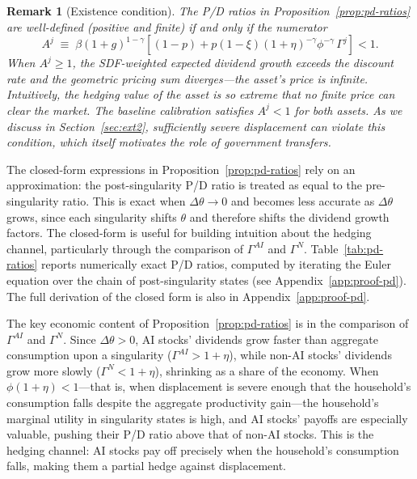\documentclass[12pt]{article}
\newtheorem{remark}{Remark}
\begin{document}
\begin{remark}[Existence condition] \label{rem:existence} %
The P/D ratios in Proposition~\ref{prop:pd-ratios} are well-defined (positive and finite) if and only if the numerator
\begin{equation}
A^j \;\equiv\; \beta(1+g)^{1-\gamma}\left[(1-p) + p(1-\xi)(1+\eta)^{-\gamma}\phi^{-\gamma}\,\Gamma^j\right] < 1. \label{eq:existence}
\end{equation}
When $A^j \geq 1$, the SDF-weighted expected dividend growth exceeds the discount rate and the geometric pricing sum diverges---the asset's price is infinite. Intuitively, the hedging value of the asset is so extreme that no finite price can clear the market. The baseline calibration satisfies $A^j < 1$ for both assets. As we discuss in Section~\ref{sec:ext2}, sufficiently severe displacement can violate this condition, which itself motivates the role of government transfers.
\end{remark}

The closed-form expressions in Proposition~\ref{prop:pd-ratios} rely on an approximation: the post-singularity P/D ratio is treated as equal to the pre-singularity ratio. This is exact when $\Delta\theta \to 0$ and becomes less accurate as $\Delta\theta$ grows, since each singularity shifts $\theta$ and therefore shifts the dividend growth factors. The closed-form is useful for building intuition about the hedging channel, particularly through the comparison of $\Gamma^{AI}$ and $\Gamma^{N}$. Table~\ref{tab:pd-ratios} reports numerically exact P/D ratios, computed by iterating the Euler equation over the chain of post-singularity states (see Appendix~\ref{app:proof-pd}). The full derivation of the closed form is also in Appendix~\ref{app:proof-pd}.

The key economic content of Proposition~\ref{prop:pd-ratios} is in the comparison of $\Gamma^{AI}$ and $\Gamma^{N}$. Since $\Delta\theta > 0$, AI stocks' dividends grow faster than aggregate consumption upon a singularity ($\Gamma^{AI} > 1+\eta$), while non-AI stocks' dividends grow more slowly ($\Gamma^{N} < 1+\eta$), shrinking as a share of the economy. When $\phi(1+\eta) < 1$---that is, when displacement is severe enough that the household's consumption falls despite the aggregate productivity gain---the household's marginal utility in singularity states is high, and AI stocks' payoffs are especially valuable, pushing their P/D ratio above that of non-AI stocks. This is the hedging channel: AI stocks pay off precisely when the household's consumption falls, making them a partial hedge against displacement.
\end{document}
